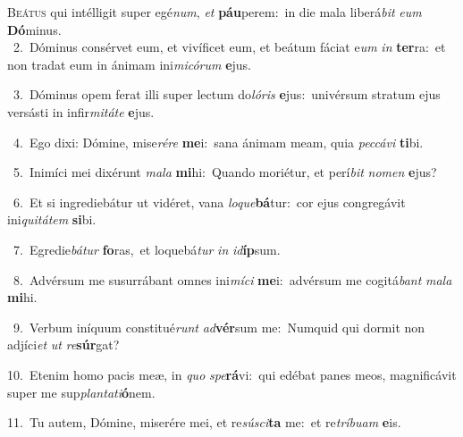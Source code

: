 \lettrine{\initial\textcolor{\initialcolor}{B}}{eátus} qui intélligit super egé\-\textit{num}\-, \textit{et} \textbf{páu}\-perem:~\star in die mala liberá\textit{bit} \textit{e}\-\textit{um} \textbf{Dó}\-minus.\\
{\numbfont\textcolor{\numbcolor}{~2.}}~Dóminus consérvet eum, et vivíficet eum, et beátum fáciat e\textit{um} \textit{in} \textbf{ter}\-ra:~\star et non tradat eum in ánimam ini\-\textit{mi}\-\textit{có}\textit{rum} \textbf{e}\-jus.\par
{\numbfont\textcolor{\numbcolor}{~3.}}~Dóminus opem ferat illi super lectum do\-\textit{ló}\-\textit{ris} \textbf{e}\-jus:~\star univérsum stratum ejus versásti in infir\-\textit{mi}\-\textit{tá}\textit{te} \textbf{e}\-jus.\par
{\numbfont\textcolor{\numbcolor}{~4.}}~Ego dixi: Dómine, mise\-\textit{ré}\-\textit{re} \textbf{me}\-i:~\star sana ánimam meam, quia \textit{pec}\-\textit{cá}\textit{vi} \textbf{ti}\-bi.\par
{\numbfont\textcolor{\numbcolor}{~5.}}~Inimíci mei dixérunt \textit{ma}\-\textit{la} \textbf{mi}\-hi:~\star Quando moriétur, et perí\textit{bit} \textit{no}\-\textit{men} \textbf{e}\-jus?\par
{\numbfont\textcolor{\numbcolor}{~6.}}~Et si ingrediebátur ut vidéret, vana \textit{lo}\-\textit{que}\textbf{bá}tur:~\star cor ejus congregávit ini\-\textit{qui}\-\textit{tá}\textit{tem} \textbf{si}\-bi.\par
{\numbfont\textcolor{\numbcolor}{~7.}}~Egredie\-\textit{bá}\-\textit{tur} \textbf{fo}\-ras,~\star et loquebá\textit{tur} \textit{in} \textit{id}\-\textbf{íp}sum.\par
{\numbfont\textcolor{\numbcolor}{~8.}}~Advérsum me susurrábant omnes ini\-\textit{mí}\-\textit{ci} \textbf{me}\-i:~\star advérsum me cogitá\textit{bant} \textit{ma}\-\textit{la} \textbf{mi}\-hi.\par
{\numbfont\textcolor{\numbcolor}{~9.}}~Verbum iníquum constitué\textit{runt} \textit{ad}\-\textbf{vér}sum me:~\star Numquid qui dormit non adjíci\textit{et} \textit{ut} \textit{re}\-\textbf{súr}gat?\par
{\numbfont\textcolor{\numbcolor}{10.}}~Etenim homo pacis meæ, in \textit{quo} \textit{spe}\-\textbf{rá}vi:~\star qui edébat panes meos, magnificávit super me sup\-\textit{plan}\-\textit{ta}\textit{ti}\textbf{ó}nem.\par
{\numbfont\textcolor{\numbcolor}{11.}}~Tu autem, Dómine, miserére mei, et re\-\textit{sú}\-\textit{sci}\textbf{ta} me:~\star et re\-\textit{trí}\-\textit{bu}\textit{am} \textbf{e}\-is.\par

